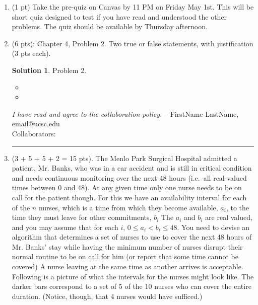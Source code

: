 \documentclass[11pt]{article}
\theoremstyle{definition}
\newtheorem*{solution}{Solution}
\begin{document}
\begin{enumerate}

\item (1 pt) Take the pre-quiz on Canvas by 11 PM on Friday May 1st.  This will be short quiz designed to test
 if you have read and understood the other problems.  The quiz should be available by Thursday afternoon.


\item (6 pts):  Chapter 4, Problem 2. Two true or false statements, with justification (3 pts each).
\begin{solution}
Problem 2.
\begin{itemize}
    \item %
    
     \item %
\end{itemize}
\end{solution}
\newpage
\emph{I have read and agree to the collaboration policy.}  -- FirstName LastName, email@ucsc.edu
\\
Collaborators: %
\\
\hrule
\item (3 + 5 + 5 + 2 = 15 pts). 
The Menlo Park Surgical Hospital admitted a patient, Mr. Banks, who was in a car accident and is still in critical condition and needs continuous monitoring over the next 48 hours (i.e.~all real-valued times between 0 and 48).
At any given time only one nurse needs to be on call for the patient though. 
For this we have an availability interval for each of the $n$ nurses, 
which is a time from which they become available, $a_i$, to the time they must leave for other commitments, $b_i$
The $a_i$ and $b_i$ are real valued, and you may assume that for each $i$, $0\leq a_i < b_i \leq 48$.
You need to devise an algorithm that determines a set of nurses to use to cover the next 48 hours of Mr. Banks' stay while having the minimum number of nurses disrupt their normal routine to be on call for him (or report that some time cannot be covered)
A nurse leaving at the same time as another arrives is acceptable. 
Following is a picture of what the intervals for the nurses might look like. 
The darker bars correspond to a set 
of 5 of the 10 nurses who can cover the entire duration. (Notice, though, that 4 nurses would have sufficed.)


\end{enumerate}
\end{document}

